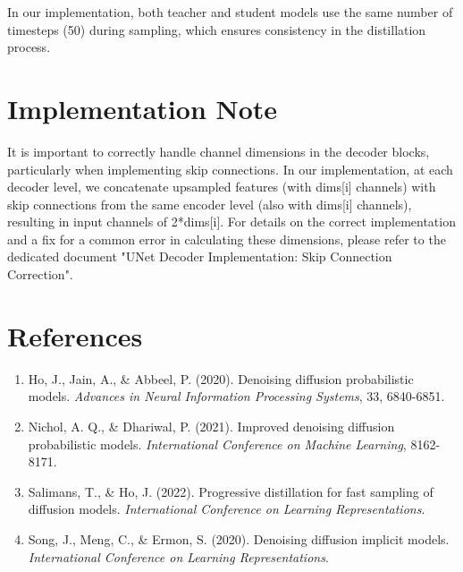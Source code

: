 \documentclass{article}
\begin{document}
In our implementation, both teacher and student models use the same number of timesteps (50) during sampling, which ensures consistency in the distillation process.

\section{Implementation Note}
It is important to correctly handle channel dimensions in the decoder blocks, particularly when implementing skip connections. In our implementation, at each decoder level, we concatenate upsampled features (with dims[i] channels) with skip connections from the same encoder level (also with dims[i] channels), resulting in input channels of 2*dims[i]. For details on the correct implementation and a fix for a common error in calculating these dimensions, please refer to the dedicated document "UNet Decoder Implementation: Skip Connection Correction".

\section{References}
\begin{enumerate}
\item Ho, J., Jain, A., \& Abbeel, P. (2020). Denoising diffusion probabilistic models. \textit{Advances in Neural Information Processing Systems}, 33, 6840-6851.
\item Nichol, A. Q., \& Dhariwal, P. (2021). Improved denoising diffusion probabilistic models. \textit{International Conference on Machine Learning}, 8162-8171.
\item Salimans, T., \& Ho, J. (2022). Progressive distillation for fast sampling of diffusion models. \textit{International Conference on Learning Representations}.
\item Song, J., Meng, C., \& Ermon, S. (2020). Denoising diffusion implicit models. \textit{International Conference on Learning Representations}.
\end{enumerate}
\end{document}
